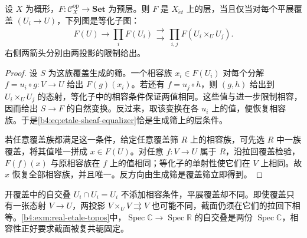 \begin{proposition}\label{b4:prop:etale-sheaf-equalizer}
	设 \(X\) 为概形，\(F:\mathcal C_X^{\mathrm{op}}\rightarrow\mathbf{Set}\) 为预层。则 \(F\) 是 \(X_{\acute{e}t}\) 上的层，当且仅当对每个平展覆盖 \((U_i\rightarrow U)\)，下列图是等化子图：
	\begin{equation}\label{b4:eq:etale-sheaf-equalizer}
		F(U)\longrightarrow\prod_iF(U_i) \mathrel{\substack{\longrightarrow\\[-0.6ex]\longrightarrow}} \prod_{i,j}F(U_i\times_UU_j).
	\end{equation}
	右侧两箭头分别由两投影的限制给出。
\end{proposition}
\begin{proof}
	设 \(S\) 为这族覆盖生成的筛。一个相容族 \(x_i\in F(U_i)\) 对每个分解 \(f=u_i\circ g:V\rightarrow U\) 给出 \(F(g)(x_i)\)。若还有 \(f=u_j\circ h\)，则 \((g,h)\) 给出到 \(U_i\times_UU_j\) 的态射，等化子中的相容条件保证两值相同。这些值与进一步限制相容，因而给出 \(S\rightarrow F\) 的自然变换。反过来，取该变换在各 \(u_i\) 上的值，便恢复相容族。于是\eqref{b4:eq:etale-sheaf-equalizer}恰是生成筛上的层条件。

	若任意覆盖族都满足这一条件，给定任意覆盖筛 \(R\) 上的相容族，可先选 \(R\) 中一族覆盖，将其值唯一拼成 \(x\in F(U)\)。对任意 \(f:V\rightarrow U\) 属于 \(R\)，沿拉回覆盖检验，\(F(f)(x)\) 与原相容族在 \(f\) 上的值相同；等化子的单射性使它们在 \(V\) 上相同。故 \(x\) 恢复全部相容族，并且唯一。反方向由生成筛是覆盖筛立即得到。
\end{proof}

开覆盖中的自交叠 \(U_i\cap U_i=U_i\) 不添加相容条件，平展覆盖却不同。即使覆盖只有一张态射 \(V\to U\)，两投影 \(V\times_UV\rightrightarrows V\) 也可能不同，截面仍须在它们的拉回下相等。\cref{b4:exm:real-etale-topos}中，\(\operatorname{Spec}\mathbb C\to\operatorname{Spec}\mathbb R\) 的自交叠是两份 \(\operatorname{Spec}\mathbb C\)，相容性正好要求截面被复共轭固定。

